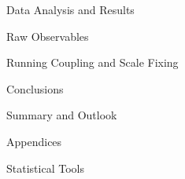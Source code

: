 \documentclass[twoside,english, a4paper, 11pt]{shared/uiofysmaster}
\begin{document}
\begin{part}{Data Analysis and Results}
	\begin{chapter}{Raw Observables}
  		\label{chap:obs_results}
  		
	\end{chapter}

	\begin{chapter}{Running Coupling and Scale Fixing}
		\label{chap:advance_results}
		
  	\end{chapter}
\end{part}

\begin{part}{Conclusions}
	\label{part:conclusion}
	\begin{chapter}{Summary and Outlook}
		\label{chap:conclusion}
		
	\end{chapter}
	
\end{part}


\begin{part}{Appendices}
	\begin{appendices}
		\begin{chapter}{Statistical Tools}
			\label{appendix:resampling}
			
		\end{chapter}
	\end{appendices}
\end{part}




\end{document}

